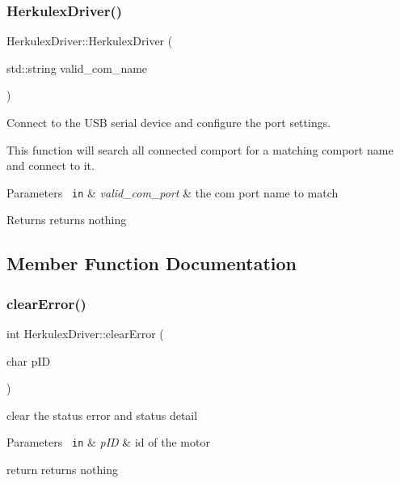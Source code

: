\subsubsection{\texorpdfstring{HerkulexDriver()}{HerkulexDriver()}}
{\footnotesize\ttfamily Herkulex\+Driver\+::\+Herkulex\+Driver (\begin{DoxyParamCaption}\item[{std\+::string}]{valid\+\_\+com\+\_\+name }\end{DoxyParamCaption})}



Connect to the U\+SB serial device and configure the port settings. 

This function will search all connected comport for a matching comport name and connect to it.


\begin{DoxyParams}[1]{Parameters}
\mbox{\texttt{ in}}  & {\em valid\+\_\+com\+\_\+port} & the com port name to match\\
\hline
\end{DoxyParams}
\begin{DoxyReturn}{Returns}
returns nothing 
\end{DoxyReturn}


\subsection{Member Function Documentation}
\mbox{\label{class_herkulex_driver_aeaf3b05814878c6c726bae1ef6a69a6f}} 
\subsubsection{\texorpdfstring{clearError()}{clearError()}}
{\footnotesize\ttfamily int Herkulex\+Driver\+::clear\+Error (\begin{DoxyParamCaption}\item[{char}]{p\+ID }\end{DoxyParamCaption})}

clear the status error and status detail


\begin{DoxyParams}[1]{Parameters}
\mbox{\texttt{ in}}  & {\em p\+ID} & id of the motor\\
\hline
\end{DoxyParams}
return returns nothing \mbox{\label{class_herkulex_driver_ac27d17cba8bbaceb0a48215cea764c0b}} 
